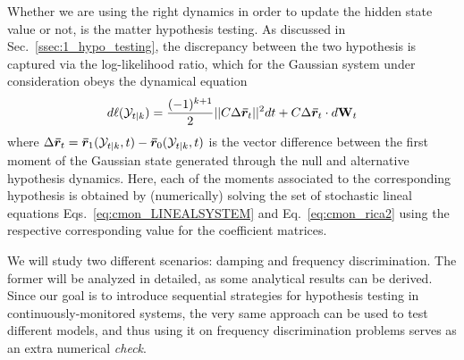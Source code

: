 Whether we are using the right dynamics in order to update the hidden state value or not, is the matter hypothesis testing. As discussed in Sec.~\ref{ssec:1_hypo_testing}, the discrepancy between the two hypothesis is captured via the log-likelihood ratio, which for the Gaussian system under consideration obeys the dynamical equation
\begin{align}\label{eq:linealLog}
d\ell(\mathcal{Y}_{t|k}) = \frac{(-1)^{k+1}}{2}||C \Delta\bm{\bar{r}}_t  ||^2 dt + C \Delta\bm{\bar{r}}_t \cdot d\mathbf{W}_t
\end{align}
where $\Delta \bm{\bar{r}}_t = \bm{\bar{r}}_{1}(\mathcal{Y}_{t|k},t)-\bm{\bar{r}}_{0}(\mathcal{Y}_{t|k},t)$ is the vector difference between the first moment of the Gaussian state generated through the null and alternative hypothesis dynamics. Here, each of the moments associated to the corresponding hypothesis is obtained by (numerically) solving the set of stochastic lineal equations Eqs.~\ref{eq:cmon_LINEALSYSTEM} and Eq.~\ref{eq:cmon_rica2} using the respective corresponding value for the coefficient matrices.

We will study two different scenarios: damping and frequency discrimination. The former will be analyzed in detailed, as some analytical results can be derived. Since our goal is to introduce sequential strategies for hypothesis testing in continuously-monitored systems, the very same approach can be used to test different models, and thus using it on frequency discrimination problems serves as an extra numerical \textit{check}.


